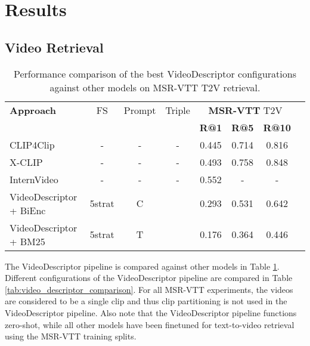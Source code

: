 \section{Results}

\subsection{Video Retrieval}

\begin{table}[htbp]
  \centering
  \begin{tabular}{lccccccc}
    \toprule
    \textbf{Approach} &FS & Prompt & Triple & \multicolumn{3}{c}{\textbf{MSR-VTT} T2V} \\
    \cmidrule(lr){5-7}
                      &&&& \textbf{R@1} & \textbf{R@5} & \textbf{R@10} \\
    \midrule
    CLIP4Clip \cite{clip4clip} &-&-&-& 0.445 & 0.714 &  0.816\\
    \midrule
    X-CLIP \cite{xclip} &-&-&-& 0.493 & 0.758 & 0.848 \\
    \midrule
    InternVideo \cite{internvideo} &-&-&-& 0.552 & - & - \\
    \bottomrule
    VideoDescriptor + BiEnc &5strat&C& & 0.293 & 0.531 & 0.642 \\
    \midrule
    VideoDescriptor + BM25 &5strat&T& & 0.176 & 0.364 & 0.446 \\
  \end{tabular}
  \caption{Performance comparison of the best VideoDescriptor configurations against other models on MSR-VTT T2V retrieval.}
  \label{tab:model_comparison}
\end{table}

The VideoDescriptor pipeline is compared against other models in Table \ref{tab:model_comparison}.
Different configurations of the VideoDescriptor pipeline are compared in Table \ref{tab:video_descriptor_comparison}.
For all MSR-VTT experiments, the videos are considered to be a single clip and thus clip partitioning is not used in the VideoDescriptor pipeline.
Also note that the VideoDescriptor pipeline functions zero-shot, while all other models have been finetuned for text-to-video retrieval using the MSR-VTT training splits.


